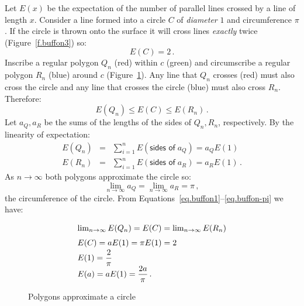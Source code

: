 Let $E(x)$ be the expectation of the number of parallel lines crossed by a line of length $x$. Consider a line formed into a circle $C$ of \emph{diameter} $1$ and circumference $\pi$. If the circle is thrown onto the surface it will cross lines \emph{exactly} twice (Figure~\ref{f.buffon3}) so:
\begin{equation}\label{eq.buffon-2}
E(C)=2\,.
\end{equation}
Inscribe a regular polygon $Q_n$ (red) within $c$ (green) and circumscribe a regular polygon $R_n$ (blue) around $c$ (Figure~\ref{f.buffon4}). Any line that $Q_n$ crosses (red) must also cross the circle and any line that crosses the circle (blue) must also cross $R_n$. Therefore:
\begin{equation}\label{eq.buffon3}
E(Q_n)\leq E(C)\leq E(R_n)\,.
\end{equation}
Let $a_Q, a_R$ be the sums of the lengths of the sides of $Q_n,R_n$, respectively. By the linearity of expectation:
{
\addtolength{\arraycolsep}{-3pt}
\begin{eqnarray}\label{eq.buffon1}
E(Q_n)&=&\sum_{i=1}^n E(\textsf{sides of}\;a_Q)=a_QE(1)\\
\label{eq.buffon2}E(R_n)&=&\sum_{i=1}^n E(\textsf{sides of}\;a_R)=a_RE(1)\,. 
\end{eqnarray}
}
As $n\rightarrow\infty$ both polygons approximate the circle so:
\begin{equation}\label{eq.buffon-pi}
\lim_{n\rightarrow\infty}a_Q = \lim_{n\rightarrow\infty} a_R=\pi\,,
\end{equation}
the circumference of the circle. From Equations~\ref{eq.buffon1}--\ref{eq.buffon-pi} we have:
\[
\renewcommand*{\arraystretch}{1.5}
\begin{array}{l}
\lim_{n\rightarrow\infty}E(Q_n)=E(C) =\lim_{n\rightarrow\infty}E(R_n)\\
E(C)=aE(1) =\pi E(1) = 2\\
E(1)=\disfrac{2}{\pi}\\
E(a)=aE(1)=\disfrac{2a}{\pi}\,.
\end{array}
\]
\begin{figure}[bt]
\begin{center}
\end{center}
\caption{Polygons approximate a circle}\label{f.buffon4}
\end{figure}

